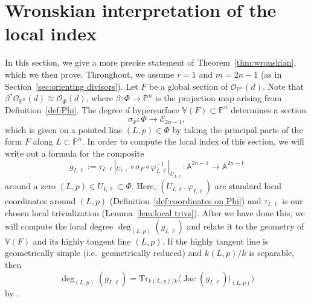 \documentclass[12pt]{amsart}
\numberwithin{equation}{section}
\theoremstyle{plain}
\theoremstyle{definition}
\newcommand{\mb}[1]{\mathbb{#1}}
\newcommand{\mc}[1]{\mathcal{#1}}
\newcommand{\vphi}{\varphi}
\newcommand{\Tr}{\mathrm{Tr}}
\newcommand{\Jac}{\operatorname{Jac}}
\begin{document}
\section{Wronskian interpretation of the local index}\label{sec:wronskian}
In this section, we give a more precise statement of Theorem~\ref{thm:wronskian}, which we then prove. Throughout, we assume $r=1$ and $m=2n-1$ (as in Section~\ref{sec:orienting divisors}). Let $F$ be a global section of $\mc{O}_{\mb{P}^n}(d)$. Note that $\beta^*\mc{O}_{\mb{P}^n}(d)\cong\mc{O}_\Phi(d)$, where $\beta\colon \Phi\to\mb{P}^n$ is the projection map arising from Definition~\ref{def:Phi}. The degree $d$ hypersurface $\mb{V}(F)\subset\mb{P}^n$ determines a section
\[\sigma_F\colon \Phi\longrightarrow\mc{E}_{2n-1},\]
which is given on a pointed line $(L,p)\in\Phi$ by taking the principal parts of the form $F$ along $L\subset\mb{P}^n$. In order to compute the local index of this section, we will write out a formula for the composite
\[g_{I,\ell}:=\tau_{I,\ell}|_{U_{I,\ell}}\circ\sigma_F\circ\vphi_{I,\ell}^{-1}|_{U_{I,\ell}}\colon \mb{A}^{2n-1}\longrightarrow\mb{A}^{2n-1}\]
around a zero $(L,p)\in U_{I,\ell}\subset\Phi$. Here, $(U_{I,\ell},\vphi_{I,\ell})$ are standard local coordinates around $(L,p)$ (Definition~\ref{def:coordinates on Phi}) and $\tau_{I,\ell}$ is our chosen local trivialization (Lemma~\ref{lem:local trivs}). After we have done this, we will compute the local degree $\deg_{(L,p)}(g_{I,\ell})$ and relate it to the geometry of $\mb{V}(F)$ and its highly tangent line $(L,p)$. If the highly tangent line is geometrically simple (i.e.~geometrically reduced) and $k(L,p)/k$ is separable, then 
\begin{equation}\label{eq:jacobian}
    \deg_{(L,p)}(g_{I,\ell})=\Tr_{k(L,p)/k}\langle\Jac(g_{I,\ell})|_{(L,p)}\rangle
\end{equation}
by \cite[Lemma 9]{KassWickelgrenEKLClass}.
\end{document}
